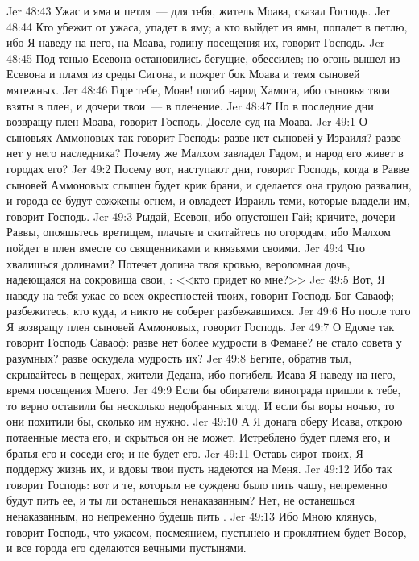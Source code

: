 \vs Jer 48:43 Ужас и яма и петля~--- для тебя, житель Моава, сказал Господь.
\vs Jer 48:44 Кто убежит от ужаса, упадет в яму; а кто выйдет из ямы, попадет в петлю, ибо Я наведу на него, на Моава, годину посещения их, говорит Господь.
\vs Jer 48:45 Под тенью Есевона остановились бегущие, обессилев; но огонь вышел из Есевона и пламя из среды Сигона, и пожрет бок Моава и темя сыновей мятежных.
\vs Jer 48:46 Горе тебе, Моав! погиб народ Хамоса, ибо сыновья твои взяты в плен, и дочери твои~--- в пленение.
\vs Jer 48:47 Но в последние дни возвращу плен Моава, говорит Господь. Доселе суд на Моава.
\vs Jer 49:1 О сыновьях Аммоновых так говорит Господь: разве нет сыновей у Израиля? разве нет у него наследника? Почему же Малхом завладел Гадом, и народ его живет в городах его?
\vs Jer 49:2 Посему вот, наступают дни, говорит Господь, когда в Равве сыновей Аммоновых слышен будет крик брани, и сделается она грудою развалин, и города ее будут сожжены огнем, и овладеет Израиль теми, которые владели им, говорит Господь.
\vs Jer 49:3 Рыдай, Есевон, ибо опустошен Гай; кричите, дочери Раввы, опояшьтесь вретищем, плачьте и скитайтесь по огородам, ибо Малхом пойдет в плен вместе со священниками и князьями своими.
\vs Jer 49:4 Что хвалишься долинами? Потечет долина твоя кровью, вероломная дочь, надеющаяся на сокровища свои, : <<кто придет ко мне?>>
\vs Jer 49:5 Вот, Я наведу на тебя ужас со всех окрестностей твоих, говорит Господь Бог Саваоф; разбежитесь, кто куда, и никто не соберет разбежавшихся.
\vs Jer 49:6 Но после того Я возвращу плен сыновей Аммоновых, говорит Господь.
\rsbpar\vs Jer 49:7 О Едоме так говорит Господь Саваоф: разве нет более мудрости в Фемане?  не стало совета у разумных? разве оскудела мудрость их?
\vs Jer 49:8 Бегите, обратив тыл, скрывайтесь в пещерах, жители Дедана, ибо погибель Исава Я наведу на него,~--- время посещения Моего.
\vs Jer 49:9 Если бы обиратели винограда пришли к тебе, то верно оставили бы несколько недобранных ягод. И если бы воры  ночью, то они похитили бы, сколько им нужно.
\vs Jer 49:10 А Я донага оберу Исава, открою потаенные места его, и скрыться он не может. Истреблено будет племя его, и братья его и соседи его; и не будет его.
\vs Jer 49:11 Оставь сирот твоих, Я поддержу жизнь их, и вдовы твои пусть надеются на Меня.
\vs Jer 49:12 Ибо так говорит Господь: вот и те, которым не суждено было пить чашу, непременно будут пить ее, и ты ли останешься ненаказанным? Нет, не останешься ненаказанным, но непременно будешь пить .
\vs Jer 49:13 Ибо Мною клянусь, говорит Господь, что ужасом, посмеянием, пустынею и проклятием будет Восор, и все города его сделаются вечными пустынями.
